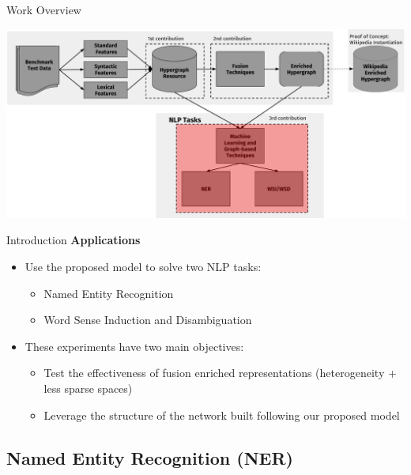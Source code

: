 \documentclass[10pt,xcolor=table]{beamer}
\begin{document}
\begin{frame}{Work Overview}
\begin{center}
\includegraphics[width=1.04\linewidth]{image2/Chapitre4/main_diag_presi_contri3.pdf}
\end{center}

 \vspace{\textheight}
\end{frame} 

\begin{frame}{Introduction}
\large \textbf{Applications}
\vspace{.5cm}
\begin{itemize}
\item Use the proposed model  to solve two NLP tasks:
	\begin{itemize}
	\item Named Entity Recognition 
	\item Word Sense Induction and Disambiguation
	\end{itemize}
\vspace{.3cm}
\item These experiments have two main objectives:
	\begin{itemize}
	\item Test the effectiveness of fusion enriched representations (heterogeneity + less sparse spaces)
	\item Leverage the structure of the network built following our proposed model
	\end{itemize}

\end{itemize}
\vspace{\textheight}
\end{frame}

\subsection{Named Entity Recognition (NER)}
\end{document}
